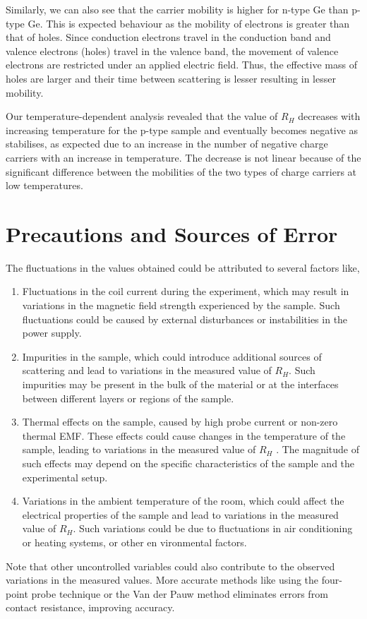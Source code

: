 Similarly, we can also see that the carrier mobility is higher for n-type Ge than p-type Ge. This is expected behaviour as the mobility of electrons is greater than that of holes. Since conduction electrons travel in the conduction band and valence electrons (holes) travel in the valence band, the movement of valence electrons are restricted under an applied electric field. Thus, the effective mass of holes are larger and their time between scattering is lesser resulting in lesser mobility.  

Our temperature-dependent analysis revealed that the value of $R_H$ decreases with increasing temperature for the p-type sample and eventually becomes negative as stabilises, as expected due to an increase in the number of negative charge carriers with an increase in temperature. The decrease is not linear because of the significant difference between the mobilities of the two types of charge carriers at low temperatures.

\section{Precautions and Sources of Error}

The fluctuations in the values obtained could be attributed to several factors like,

    \begin{enumerate}
        \item Fluctuations in the coil current during the experiment, which may result in variations in the magnetic field strength experienced by the sample. Such
        fluctuations could be caused by external disturbances or instabilities in the power supply.
        \item Impurities in the sample, which could introduce additional sources of scattering and lead to variations
        in the measured value of $R_H$. Such impurities may
        be present in the bulk of the material or at the interfaces between different layers or regions of the
        sample.
        \item Thermal effects on the sample, caused by high probe
        current or non-zero thermal EMF. These effects
        could cause changes in the temperature of the sample, leading to variations in the measured value of
        $R_H$ . The magnitude of such effects may depend on
        the specific characteristics of the sample and the
        experimental setup.
        \item Variations in the ambient temperature of the room,
        which could affect the electrical properties of the sample and lead to variations in the measured value
        of $R_H$. Such variations could be due to fluctuations
        in air conditioning or heating systems, or other en
        vironmental factors.
    \end{enumerate}

\noindent Note that other uncontrolled variables could also contribute to the observed variations in the measured values. More accurate methods like using the four-point probe technique or the Van der Pauw method eliminates errors from contact resistance, improving accuracy.